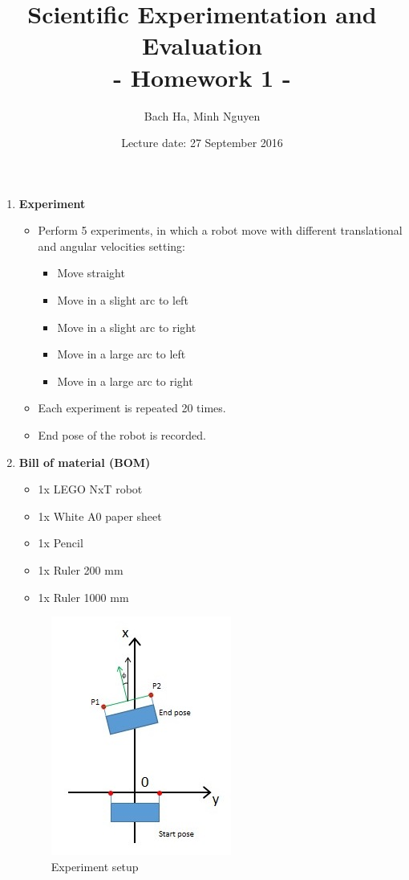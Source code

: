 \documentclass[a4paper, 12pt]{article}
\title{Scientific Experimentation and Evaluation \\
	- Homework 1 -}
\author{Bach Ha, Minh Nguyen}
\date{Lecture date: 27 September 2016}
\begin{document}
	
	\maketitle
	
	
	\begin{enumerate}
		\item \textbf{Experiment}
		\begin{itemize}
			\item Perform 5 experiments, in which a robot move with different translational and angular velocities setting:
				\begin{itemize}
					\item Move straight
					\item Move in a slight arc to left
					\item Move in a slight arc to right
					\item Move in a large arc to left
					\item Move in a large arc to right
				\end{itemize}
			\item Each experiment is repeated 20 times.
			\item End pose of the robot is recorded.
		\end{itemize}
		
		\item \textbf{Bill of material (BOM)}
		\begin{itemize}
			\item 1x LEGO NxT robot
			\item 1x White A0 paper sheet
			\item 1x Pencil
			\item 1x Ruler  200 mm
			\item 1x Ruler 1000 mm
		\end{itemize}
		
		\begin{figure}
		\centering
		\includegraphics[width=0.5\linewidth]{images/Img1}
		\caption{Experiment setup}
		\label{fig:img1}
		\end{figure}
		

\end{enumerate}
\end{document}
